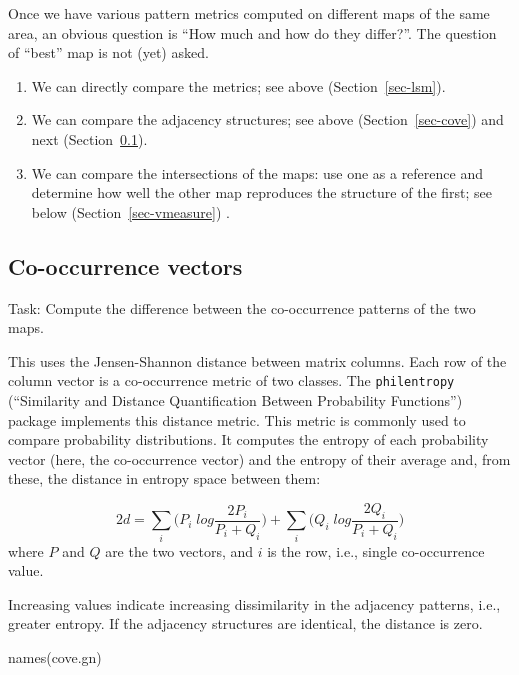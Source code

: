 \documentclass[
  letterpaper,
  DIV=11,
  numbers=noendperiod]{scrartcl}
\newenvironment{Shaded}{\begin{snugshade}}{\end{snugshade}}
\newcommand{\FunctionTok}[1]{\textcolor[rgb]{0.28,0.35,0.67}{#1}}
\newcommand{\NormalTok}[1]{\textcolor[rgb]{0.00,0.23,0.31}{#1}}
\begin{document}
Once we have various pattern metrics computed on different maps of the
same area, an obvious question is ``How much and how do they differ?''.
The question of ``best'' map is not (yet) asked.

\begin{enumerate}
\def\labelenumi{\arabic{enumi}.}
\item
  We can directly compare the metrics; see above
  (Section~\ref{sec-lsm}).
\item
  We can compare the adjacency structures; see above
  (Section~\ref{sec-cove}) and next (Section~\ref{sec-compare-cove}).
\item
  We can compare the intersections of the maps: use one as a reference
  and determine how well the other map reproduces the structure of the
  first; see below (Section~\ref{sec-vmeasure}) .
\end{enumerate}

\hypertarget{sec-compare-cove}{%
\subsection{Co-occurrence vectors}\label{sec-compare-cove}}

Task: Compute the difference between the co-occurrence patterns of the
two maps.

This uses the Jensen-Shannon distance between matrix columns. Each row
of the column vector is a co-occurrence metric of two classes. The
\texttt{philentropy} (``Similarity and Distance Quantification Between
Probability Functions'') package implements this distance metric. This
metric is commonly used to compare probability distributions. It
computes the entropy of each probability vector (here, the co-occurrence
vector) and the entropy of their average and, from these, the distance
in entropy space between them:

\[2d = \sum_i \big(P_i \; log\frac{2 P_i}{P_i + Q_i}\big) + \sum_i \big(Q_i \; log\frac{2 Q_i}{P_i + Q_i}\big)\]
where \(P\) and \(Q\) are the two vectors, and \(i\) is the row, i.e.,
single co-occurrence value.

Increasing values indicate increasing dissimilarity in the adjacency
patterns, i.e., greater entropy. If the adjacency structures are
identical, the distance is zero.

\begin{Shaded}
\begin{Highlighting}[]
\FunctionTok{names}\NormalTok{(cove.gn)}
\end{Highlighting}
\end{Shaded}
\end{document}
